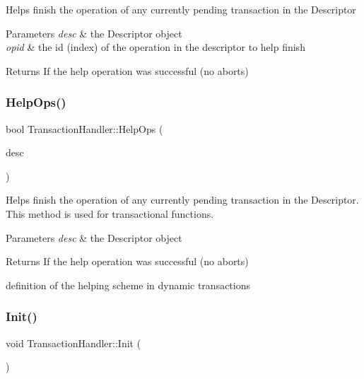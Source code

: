 Helps finish the operation of any currently pending transaction in the Descriptor


\begin{DoxyParams}{Parameters}
{\em desc} & the Descriptor object \\
\hline
{\em opid} & the id (index) of the operation in the descriptor to help finish \\
\hline
\end{DoxyParams}
\begin{DoxyReturn}{Returns}
If the help operation was successful (no aborts) 
\end{DoxyReturn}
\mbox{\label{classTransactionHandler_a418edee7734a307fced6e4280e6fa5f0}} 
\subsubsection{\texorpdfstring{Help\+Ops()}{HelpOps()}\hspace{0.1cm}{\footnotesize\ttfamily [2/2]}}
{\footnotesize\ttfamily bool Transaction\+Handler\+::\+Help\+Ops (\begin{DoxyParamCaption}\item[{\hyperlink{structDesc}{Desc} $\ast$}]{desc }\end{DoxyParamCaption})}

Helps finish the operation of any currently pending transaction in the Descriptor. This method is used for transactional functions.


\begin{DoxyParams}{Parameters}
{\em desc} & the Descriptor object \\
\hline
\end{DoxyParams}
\begin{DoxyReturn}{Returns}
If the help operation was successful (no aborts)
\end{DoxyReturn}
definition of the helping scheme in dynamic transactions \mbox{\label{classTransactionHandler_a9f45dc37682c5bee0f80785c0e79ce01}} 
\subsubsection{\texorpdfstring{Init()}{Init()}}
{\footnotesize\ttfamily void Transaction\+Handler\+::\+Init (\begin{DoxyParamCaption}{ }\end{DoxyParamCaption})}

